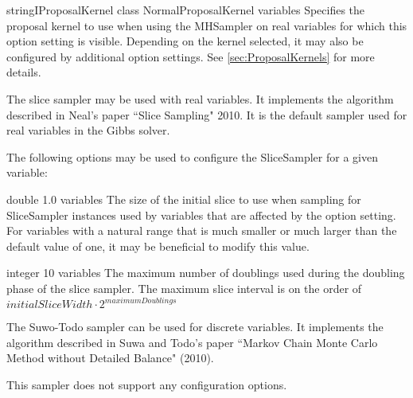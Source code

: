 
{\ifmatlab string\fi \ifjava IProposalKernel class\fi}
{NormalProposalKernel}
{variables}
{Specifies the proposal kernel to use when using the MHSampler on real variables for which this option setting is visible. Depending on the kernel selected, it may also be configured by additional option settings. See \autoref{sec:ProposalKernels} for more details.}

\label{sec:SliceSampler}

The slice sampler may be used with real variables. It implements the algorithm described in Neal's paper ``Slice Sampling" 2010. It is the default sampler used for real variables in the Gibbs solver.

The following options may be used to configure the SliceSampler for a given variable:


{double}
{1.0}
{variables}
{The size of the initial slice to use when sampling for SliceSampler instances used by variables that are affected by the option setting. For variables with a natural range that is much smaller or much larger than the default value of one, it may be beneficial to modify this value.}


{integer}
{10}
{variables}
{The maximum number of doublings used during the doubling phase of the slice sampler.  The maximum slice interval is on the order of $initialSliceWidth \cdot 2^{maximumDoublings}$}

\label{sec:SuwoTodoSampler}

The Suwo-Todo sampler can be used for discrete variables. It implements the algorithm described in Suwa and Todo's paper ``Markov Chain Monte Carlo Method without Detailed Balance" (2010).

This sampler does not support any configuration options.
